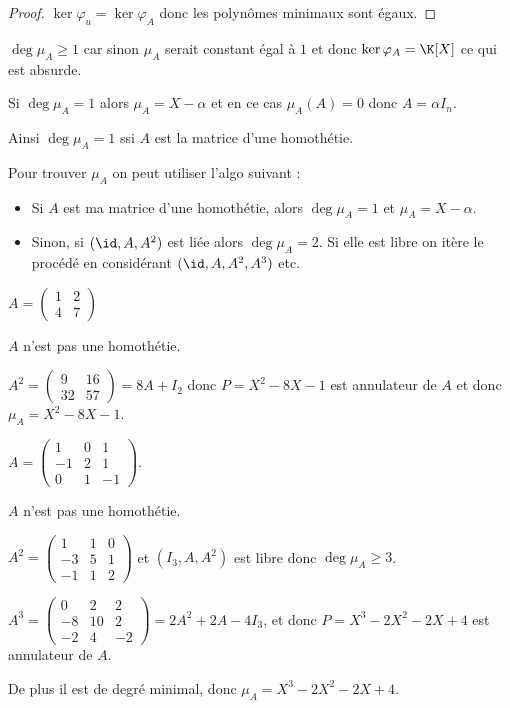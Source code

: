 \begin{proof}
    $\ker \varphi_u = \ker \varphi_A$ donc les polynômes minimaux sont égaux.
\end{proof}

\begin{remarque}
    $\deg \mu_A \geqslant 1$ car sinon $\mu_A$ serait constant égal à $1$ et donc
    $\ker \varphi_A = \K[X]$ ce qui est absurde.

    \avspace Si $\deg \mu_A = 1$ alors $\mu_A = X - \alpha$ et en ce cas 
    $\mu_A(A) = 0$ donc $A = \alpha I_n$.

    Ainsi $\deg \mu_A = 1$ ssi $A$ est la matrice d'une homothétie.

    \avspace Pour trouver $\mu_A$ on peut utiliser l'algo suivant : 
    \begin{itemize}
        \item Si $A$ est ma matrice d'une homothétie, alors $\deg \mu_A = 1$ et $\mu_A = X - \alpha$.
        \item Sinon, si $(\id, A, A^2)$ est liée alors $\deg \mu_A = 2$. Si elle est libre on itère 
            le procédé en considérant $(\id, A, A^2, A^3)$ etc.
    \end{itemize}
\end{remarque}

\begin{exemple}
    $A = \begin{pmatrix}
        1 & 2 \\
        4 & 7
    \end{pmatrix}$

    $A$ n'est pas une homothétie.

    $A^2 = \begin{pmatrix}
        9 & 16 \\
        32 & 57
    \end{pmatrix} = 8 A + I_2$ donc $P = X^2 - 8X - 1$ est annulateur de $A$ et 
    donc $\mu_A = X^2 - 8X - 1$.

    \lvspace $A = \begin{pmatrix}
        1 & 0 & 1 \\
        -1& 2 & 1 \\
        0 & 1 & -1
    \end{pmatrix}$. 

    $A$ n'est pas une homothétie.

    $A^2 = \begin{pmatrix}
        1 & 1 & 0 \\
        -3 & 5 & 1 \\
        -1 & 1 & 2
    \end{pmatrix}$ et $(I_3, A, A^2)$ est libre donc $\deg \mu_A \geqslant 3$.

    $A^3 = \begin{pmatrix}
        0 & 2 & 2 \\
        -8 & 10 & 2 \\
        -2 & 4 & -2
    \end{pmatrix} = 2 A^2 + 2A - 4 I_3$, et donc $P = X^3 - 2X^2 - 2X + 4$ est annulateur de $A$.

    De plus il est de degré minimal, donc $\mu_A = X^3 - 2X^2 - 2X + 4$.
\end{exemple}

